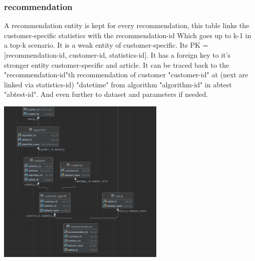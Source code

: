 \documentclass[a4paper,12pt]{article}
\begin{document}
	\subsubsection{recommendation}
	A recommendation entity is kept for every recommendation, this table links the customer-specific statistics with the recommendation-id Which goes up to k-1 in a top-k scenario. It is a weak entity of customer-specific. Its PK = [recommendation-id, customer-id, statistics-id]. It has a foreign key to it's stronger entity customer-specific and article. It can be traced back to the "recommendation-id"th recommendation of customer "customer-id" at (next are linked via statistics-id) "datetime" from algorithm "algorithm-id" in abtest "abtest-id". And even further to dataset and parameters if needed.  
	\begin{center}

		\includegraphics[height={300px}]{Customer-Specific.png}

\end{center}		
\end{document}
